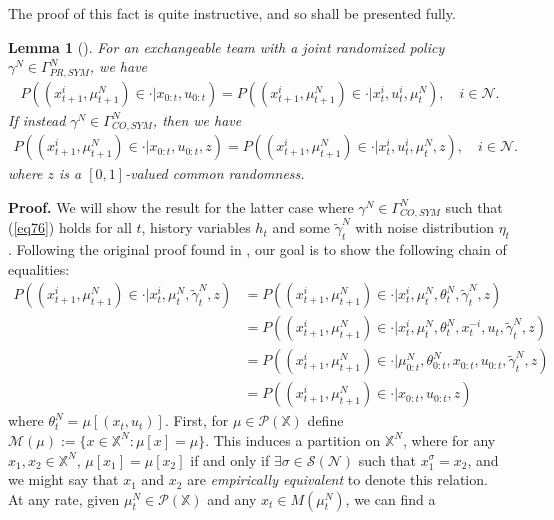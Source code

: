 \documentclass[12pt, oneside]{report}
\newcommand{\mbb}[1]{\mathbb{#1}}
\newcommand{\1}[1]{\mathbbm{1}_{\{#1\}}}
\newcommand{\mc}[1]{\mathcal{#1}}
\newtheorem{lemma}[theorem]{Lemma}
\theoremstyle{definition}
\begin{document}
The proof of this fact is quite instructive, and so shall be presented fully. 
\begin{lemma}[{\cite[lemma 1]{Sanjari_Saldi_Yüksel_2024}}]\label{lem2}
    For an exchangeable team with a joint randomized policy $\gamma^N\in\Gamma^N_{PR,\mathit{SYM}}$, we have
    \begin{align*}
        P((x^i_{t+1},\mu^N_{t+1})\in\cdot|x_{0:t},u_{0:t})=P((x^i_{t+1},\mu^N_{t+1})\in\cdot|x^i_t,u^i_t,\mu^N_t),\quad i\in\mc{N}.
    \end{align*} 
    If instead $\gamma^N\in\Gamma^N_{CO,\mathit{SYM}}$, then we have
    \begin{align*}
        P((x^i_{t+1},\mu^N_{t+1})\in\cdot|x_{0:t},u_{0:t},z)=P((x^i_{t+1},\mu^N_{t+1})\in\cdot|x^i_t,u^i_t,\mu^N_t,z),\quad i\in\mc{N}.
    \end{align*} 
    where $z$ is a $[0,1]$-valued common randomness.
\end{lemma}
\noindent\textbf{Proof.} We will show the result for the latter case where $\gamma^N\in\Gamma^N_{CO,\mathit{SYM}}$ such that (\ref{eq76}) holds for all
$t$, history variables $h_t$ and some $\tilde{\gamma}^N_t$ with noise distribution $\eta_t$. Following the original proof found in \cite[appendix B, lemma 1]{Sanjari_Saldi_Yüksel_2024}, our goal is to show the following chain of equalities:
\begin{align}
    P((x^i_{t+1},\mu^N_{t+1})\in\cdot|x^i_t,\mu^N_t,\widetilde{\gamma}^N_t,z)&=P((x^i_{t+1},\mu^N_{t+1})\in\cdot|x^i_t,\mu^N_t,\theta^N_t,\widetilde{\gamma}^N_t,z)\label{eq78}\\
    &=P((x^i_{t+1},\mu^N_{t+1})\in\cdot|x^i_t,\mu^N_t,\theta^N_t,x^{-i}_t,u_t,\widetilde{\gamma}^N_t,z)\label{eq82}\\
    &=P((x^i_{t+1},\mu^N_{t+1})\in\cdot|\mu^N_{0:t},\theta^N_{0:t},x_{0:t},u_{0:t},\widetilde{\gamma}^N_t,z)\label{eq83}\\
    &=P((x^i_{t+1},\mu^N_{t+1})\in\cdot|x_{0:t},u_{0:t},z)\label{eq84}
\end{align}
where $\theta^N_t=\mu[(x_t,u_t)]$. First, for $\mu\in\mc{P}(\mbb{X})$ define $\mc{M}(\mu):=\{x\in\mbb{X}^N:\mu[x]=\mu\}$. This induces a partition on $\mbb{X}^N$, where for any $x_1,x_2\in\mbb{X}^N$, $\mu[x_1]=\mu[x_2]$ if and only if $\exists\sigma\in\mc{S}(\mc{N})$ such that $x^\sigma_1=x_2$,
and we might say that $x_1$ and $x_2$ are \textit{empirically equivalent} to denote this relation.\\[5pt]
\indent At any rate, given $\mu^N_t\in\mc{P}(\mbb{X})$ and any $x_t\in M(\mu^N_t)$, we can find a
\end{document}
